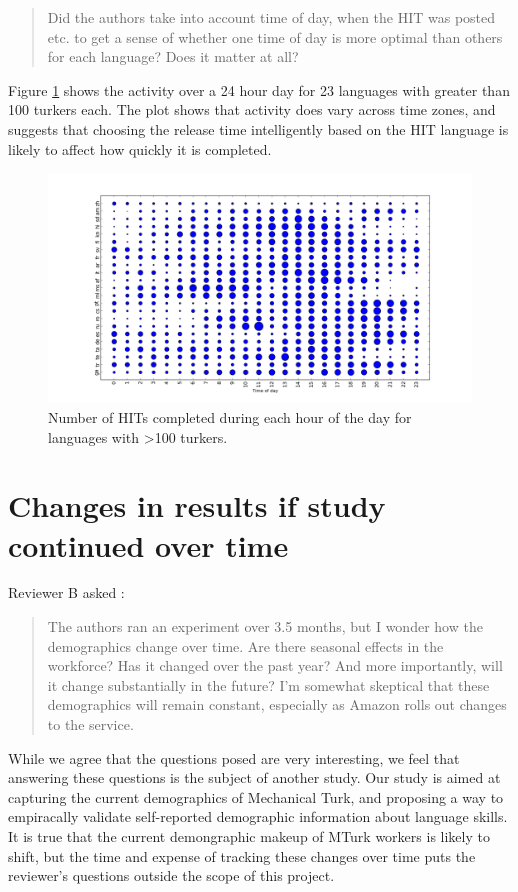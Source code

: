 \documentclass[11pt]{article}
\begin{document}
\begin{quote}
Did the authors take into account time of day, when the HIT was posted etc. to get a sense of whether one time of day is more optimal than others for each language? Does it matter at all?
\end{quote}
Figure \ref{time} shows the activity over a 24 hour day for 23 languages with greater than 100 turkers each. The plot shows that activity does vary across time zones, and suggests that choosing the release time intelligently based on the HIT language is likely to affect how quickly it is completed.
\begin{figure}
\includegraphics[width=1\linewidth]{figures/times.png}
\caption{Number of HITs completed during each hour of the day for languages with \textgreater 100 turkers.}
\label{time}
\end{figure}

\section{Changes in results if study continued over time}

Reviewer B asked : 
\begin{quote}
The authors ran an experiment over 3.5 months, but I wonder how the demographics change over time. Are there seasonal effects in the workforce? Has it changed over the past year? And more importantly, will it change substantially in the future? I'm somewhat skeptical that these demographics will remain constant, especially as Amazon rolls out changes to the service.
\end{quote}

While we agree that the questions posed are very interesting, we feel that answering these questions is the subject of another study. Our study is aimed at capturing the current demographics of Mechanical Turk, and proposing a way to empiracally validate self-reported demographic information about language skills. It is true that the current demongraphic makeup of MTurk workers is likely to shift, but the time and expense of tracking these changes over time puts the reviewer's questions outside the scope of this project.
\end{document}
